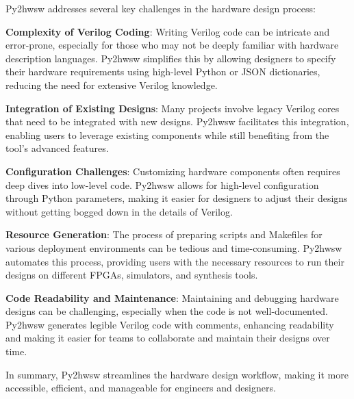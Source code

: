 %

Py2hwsw addresses several key challenges in the hardware design process:

\textbf{Complexity of Verilog Coding}: Writing Verilog code can be intricate
and error-prone, especially for those who may not be deeply familiar with
hardware description languages. Py2hwsw simplifies this by allowing designers
to specify their hardware requirements using high-level Python or JSON
dictionaries, reducing the need for extensive Verilog knowledge.

\textbf{Integration of Existing Designs}: Many projects involve legacy Verilog
cores that need to be integrated with new designs. Py2hwsw facilitates this
integration, enabling users to leverage existing components while still
benefiting from the tool's advanced features.

\textbf{Configuration Challenges}: Customizing hardware components often
requires deep dives into low-level code. Py2hwsw allows for high-level
configuration through Python parameters, making it easier for designers to
adjust their designs without getting bogged down in the details of Verilog.

\textbf{Resource Generation}: The process of preparing scripts and Makefiles
for various deployment environments can be tedious and time-consuming. Py2hwsw
automates this process, providing users with the necessary resources to run
their designs on different FPGAs, simulators, and synthesis tools.

\textbf{Code Readability and Maintenance}: Maintaining and debugging hardware
designs can be challenging, especially when the code is not well-documented.
Py2hwsw generates legible Verilog code with comments, enhancing readability and
making it easier for teams to collaborate and maintain their designs over time.

In summary, Py2hwsw streamlines the hardware design workflow, making it more
accessible, efficient, and manageable for engineers and designers.
